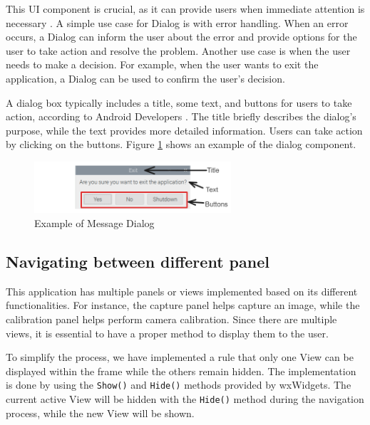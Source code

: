 This UI component is crucial, as it can provide users when immediate attention is necessary \cite{MaterialUI}. A simple use case for Dialog is with error handling. When an error occurs, a Dialog can inform the user about the error and provide options for the user to take action and resolve the problem. Another use case is when the user needs to make a decision. For example, when the user wants to exit the application, a Dialog can be used to confirm the user's decision.

A dialog box typically includes a title, some text, and buttons for users to take action, according to Android Developers \cite{Android_Developers}. The title briefly describes the dialog's purpose, while the text provides more detailed information. Users can take action by clicking on the buttons. Figure \ref{fig:message_dialog} shows an example of the dialog component.

\begin{figure}[!ht]
    \centering
    \includegraphics[width=0.65\textwidth]{texs/Part2/chapter4/image/dialog.png}
    \caption{Example of Message Dialog}
    \label{fig:message_dialog}
\end{figure}

\subsection{Navigating between different panel}
\label{subsec:navigating_between_different_panel}

This application has multiple panels or views implemented based on its different functionalities. For instance, the capture panel helps capture an image, while the calibration panel helps perform camera calibration. Since there are multiple views, it is essential to have a proper method to display them to the user.

To simplify the process, we have implemented a rule that only one View can be displayed within the frame while the others remain hidden. The implementation is done by using the \texttt{Show()} and \texttt{Hide()} methods provided by wxWidgets. The current active View will be hidden with the \texttt{Hide()} method during the navigation process, while the new View will be shown.

